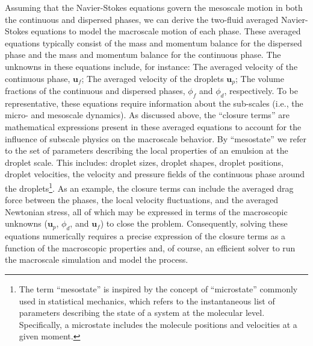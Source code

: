 Assuming that the Navier-Stokes equations govern the mesoscale motion in both the continuous and dispersed phases, we can derive the two-fluid averaged Navier-Stokes equations to model the macroscale motion of each phase. 
These averaged equations typically consist of the mass and momentum balance for the dispersed phase and the mass and momentum balance for the continuous phase. 
The unknowns in these equations include, for instance: The averaged velocity of the continuous phase, $\textbf{u}_f$; The averaged velocity of the droplets $\textbf{u}_p$; The volume fractions of the continuous and dispersed phases, $\phi_f$ and $\phi_d$, respectively. 
To be representative, these equations require information about the sub-scales (i.e., the micro- and mesoscale dynamics).
As discussed above, the ``closure terms'' are mathematical expressions present in these averaged equations to account for the influence of subscale physics on the macroscale behavior. 
By ``mesostate'' we refer to the set of parameters describing the local properties of an emulsion at the droplet scale.
This includes:  droplet sizes, droplet shapes, droplet positions, droplet velocities, the velocity and pressure fields of the continuous phase around the droplets\footnote{
    The term ``mesostate'' is inspired by the concept of ``microstate'' commonly used in statistical mechanics, which refers to the instantaneous list of parameters describing the state of a system at the molecular level. Specifically, a microstate includes the molecule positions and velocities at a given moment.
    }. 
As an example, the closure terms can include the averaged drag force between the phases, the local velocity fluctuations, and the averaged Newtonian stress, all of which may be expressed in terms of the macroscopic unknowns ($\textbf{u}_p$, $\phi_d$, and $\textbf{u}_f$) to close the problem.
Consequently, solving these equations numerically requires a precise expression of the closure terms as a function of the macroscopic properties and, of course, an efficient solver to run the macroscale simulation and model the process.

